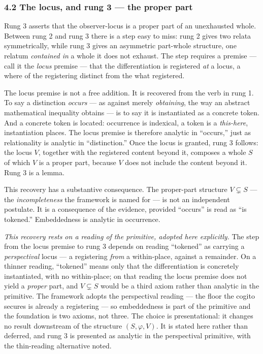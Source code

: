 \documentclass[
]{article}
\begin{document}
\hypertarget{the-locus-and-rung-3-the-proper-part}{%
\subsubsection{4.2 The locus, and rung 3 --- the proper
part}\label{the-locus-and-rung-3-the-proper-part}}

Rung 3 asserts that the observer-locus is a proper part of an
unexhausted whole. Between rung 2 and rung 3 there is a step easy to
miss: rung 2 gives two relata symmetrically, while rung 3 gives an
asymmetric part-whole structure, one relatum \emph{contained in} a whole
it does not exhaust. The step requires a premise --- call it the
\emph{locus} premise --- that the differentiation is registered
\emph{at} a locus, a where of the registering distinct from the what
registered.

The locus premise is not a free addition. It is recovered from the verb
in rung 1. To say a distinction \emph{occurs} --- as against merely
\emph{obtaining}, the way an abstract mathematical inequality obtains
--- is to say it is instantiated as a concrete token. And a concrete
token is located: occurrence is indexical, a token is a
\emph{this-here}, instantiation places. The locus premise is therefore
analytic in ``occurs,'' just as relationality is analytic in
``distinction.'' Once the locus is granted, rung 3 follows: the locus
\(V\), together with the registered content beyond it, composes a whole
\(S\) of which \(V\) is a proper part, because \(V\) does not include
the content beyond it. Rung 3 is a lemma.

This recovery has a substantive consequence. The proper-part structure
\(V \subsetneq S\) --- the \emph{incompleteness} the framework is named
for --- is not an independent postulate. It is a consequence of the
evidence, provided ``occurs'' is read as ``is tokened.'' Embeddedness is
analytic in occurrence.

\emph{This recovery rests on a reading of the primitive, adopted here
explicitly.} The step from the locus premise to rung 3 depends on
reading ``tokened'' as carrying a \emph{perspectival} locus --- a
registering \emph{from} a within-place, against a remainder. On a
thinner reading, ``tokened'' means only that the differentiation is
concretely instantiated, with no within-place; on that reading the locus
premise does not yield a \emph{proper} part, and \(V \subsetneq S\)
would be a third axiom rather than analytic in the primitive. The
framework adopts the perspectival reading --- the floor the cogito
secures is already a registering --- so embeddedness is part of the
primitive and the foundation is two axioms, not three. The choice is
presentational: it changes no result downstream of the structure
\((S, \varphi, V)\). It is stated here rather than deferred, and rung 3
is presented as analytic in the perspectival primitive, with the
thin-reading alternative noted.
\end{document}
